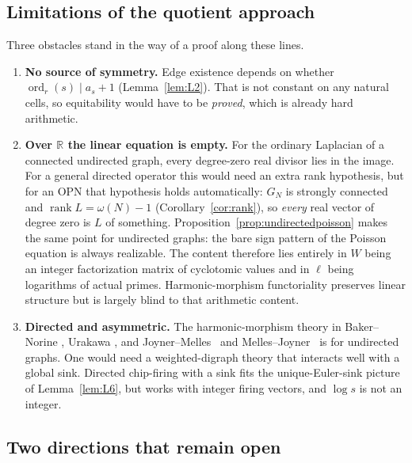 \documentclass[11pt]{article}
\theoremstyle{definition}
\theoremstyle{remark}
\DeclareMathOperator{\ord}{ord}
\newcommand{\R}{\mathbb{R}}
\begin{document}
\subsection{Limitations of the quotient approach}

Three obstacles stand in the way of a proof along these lines.

\begin{enumerate}[leftmargin=1.5em]
\item \textbf{No source of symmetry.} Edge existence depends on whether
  $\ord_r(s)\mid a_s+1$ (Lemma~\ref{lem:L2}). That is not constant on any
  natural cells, so equitability would have to be \emph{proved}, which
  is already hard arithmetic.
\item \textbf{Over $\R$ the linear equation is empty.}  For the ordinary
  Laplacian of a connected undirected graph, every degree-zero real divisor
  lies in the image.  For a general directed operator this would need an
  extra rank hypothesis, but for an OPN that hypothesis holds automatically:
  $G_N$ is strongly connected and $\operatorname{rank}L=\omega(N)-1$
  (Corollary~\ref{cor:rank}), so \emph{every} real vector of degree zero is
  $L$ of something.  Proposition~\ref{prop:undirectedpoisson} makes the same
  point for undirected graphs: the bare sign pattern of the Poisson equation
  is always realizable.  The content therefore lies entirely in $W$ being an
  integer factorization matrix of cyclotomic values and in $\ell$ being
  logarithms of actual primes.
  Harmonic-morphism functoriality preserves linear structure but is largely
  blind to that arithmetic content.
\item \textbf{Directed and asymmetric.} The harmonic-morphism theory in
  Baker--Norine \cite{BN}, Urakawa \cite{Urakawa}, and
  Joyner--Melles~\cite{JM2017} and Melles--Joyner~\cite{MJ2026, MJappl} is for undirected
  graphs. One would need a weighted-digraph theory that interacts well
  with a global sink. Directed chip-firing with a sink
  \cite{HLMPPW} fits the unique-Euler-sink picture of
  Lemma~\ref{lem:L6}, but works with integer firing vectors, and
  $\log s$ is not an integer.
\end{enumerate}

\subsection{Two directions that remain open}\label{sec:blowup}
\end{document}
